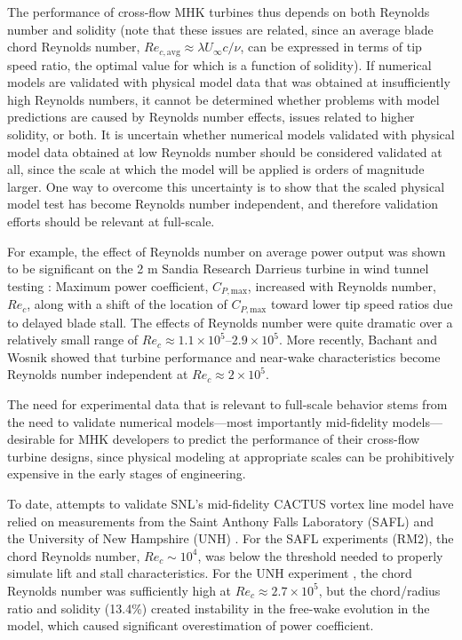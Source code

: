 \documentclass[10pt,letterpaper]{article}
\begin{document}
The performance of cross-flow MHK turbines thus depends on both Reynolds number
and solidity (note that these issues are related, since an average blade chord
Reynolds number, $Re_{c,\mathrm{avg}} \approx \lambda U_\infty c/ \nu$, can be
expressed in terms of tip speed ratio, the optimal value for which is a function
of solidity). If numerical models are validated with physical model data that
was obtained at insufficiently high Reynolds numbers, it cannot be determined
whether problems with model predictions are caused by Reynolds number effects,
issues related to higher solidity, or both. It is uncertain whether numerical
models validated with physical model data obtained at low Reynolds number should
be considered validated at all, since the scale at which the model will be
applied is orders of magnitude larger. One way to overcome this uncertainty is
to show that the scaled physical model test has become Reynolds number
independent, and therefore validation efforts should be relevant at full-scale.

For example, the effect of Reynolds number on average power output was shown to
be significant on the 2 m Sandia Research Darrieus turbine in wind tunnel
testing \cite{Blackwell1976}: Maximum power coefficient, $C_{P,\mathrm{max}}$,
increased with Reynolds number, $Re_c$, along with a shift of the location of
$C_{P,\mathrm{max}}$ toward lower tip speed ratios due to delayed blade stall.
The effects of Reynolds number were quite dramatic over a relatively small range
of $Re_c \approx 1.1 \times 10^5$--$2.9 \times 10^5$. More recently, Bachant and
Wosnik \cite{Bachant2014, Bachant2015-RVAT-Re-dep} showed that turbine
performance and near-wake characteristics become Reynolds number independent at
$Re_c \approx 2 \times 10^5$.

The need for experimental data that is relevant to full-scale behavior stems
from the need to validate numerical models---most importantly mid-fidelity
models---desirable for MHK developers to predict the performance of their
cross-flow turbine designs, since physical modeling at appropriate scales can be
prohibitively expensive in the early stages of engineering.

To date, attempts to validate SNL's mid-fidelity CACTUS vortex line model
\cite{Murray2011} have relied on measurements from the Saint Anthony Falls
Laboratory (SAFL) \cite{Hill2014} and the University of New Hampshire (UNH)
\cite{Neary2013, Michelen2014}. For the SAFL experiments (RM2), the chord
Reynolds number, $Re_c \sim 10^4$, was below the threshold needed to properly
simulate lift and stall characteristics. For the UNH experiment
\cite{Bachant2013}, the chord Reynolds number was sufficiently high at $Re_c
\approx 2.7 \times 10^5$, but the chord/radius ratio and solidity (13.4\%)
created instability in the free-wake evolution in the model, which caused
significant overestimation of power coefficient.
\end{document}
